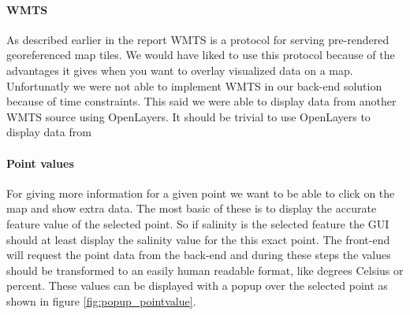 \documentclass[11pt,a4paper,titlepage,oneside]{report}
\begin{document}
\paragraph{WMTS}
As described earlier in the report \gls{WMTS} is a protocol for serving pre-rendered georeferenced map tiles. We would have liked to use this protocol because of the advantages it gives when you want to overlay visualized data on a map. Unfortunatly we were not able to implement WMTS in our back-end solution because of time constraints. This said we were able to display data from another \gls{WMTS} source using OpenLayers. It should be trivial to use OpenLayers to display data from  


\paragraph{Point values}
For giving more information for a given point we want to be able to click on the map and show extra data. The most basic of these is to display the accurate feature value of the selected point. So if salinity is the selected feature the \gls{GUI} should at least display the salinity value for the this exact point. The \gls{front-end} will request the point data from the \gls{back-end} and during these steps the values should be transformed to an easily human readable format, like degrees Celsius or percent.
These values can be displayed with a popup over the selected point as shown in figure \ref{fig:popup_pointvalue}.
\end{document}
